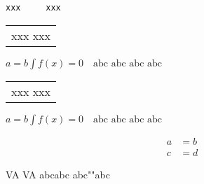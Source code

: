 \documentclass{article}
\begin{document}
\begin{lstlisting}[columns=flexible]
 xxx     xxx
\end{lstlisting}
\begin{tabular}{l}
xxx xxx
\end{tabular}

$a=b \int f(x) =0\quad  \text{abc abc abc abc} $


\begin{tabular}{l}
xxx xxx
\end{tabular}

$a=b \int f(x) =0\quad \text{abc abc abc abc} $

\begin{align}
a &=b \\
c &=d
\end{align}

\bigskip


VA VA abc\hspace{0pt}abc abc""abc
\lipsum[1]
\end{document}

